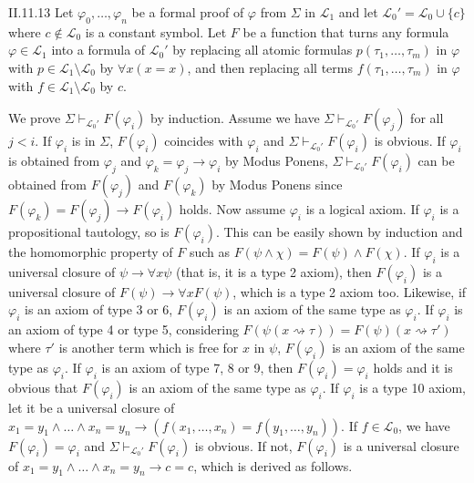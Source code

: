 \documentclass[12pt]{article}
\begin{document}
\begin{customthm}{II.11.13}
  Let $\varphi_0,\ldots,\varphi_n$ be a formal proof of $\varphi$ from $\Sigma$ in $\mathcal{L}_1$ and let $\mathcal{L}_0'=\mathcal{L}_0\cup\{c\}$ where $c\not\in\mathcal{L}_0$ is a constant symbol. Let $F$ be a function that turns any formula $\varphi\in\mathcal{L}_1$ into a formula of $\mathcal{L}_0'$ by replacing all atomic formulas $p(\tau_1,\ldots,\tau_m)$ in $\varphi$ with $p\in\mathcal{L}_1\setminus\mathcal{L}_0$ by $\forall x(x=x)$, and then replacing all terms $f(\tau_1,\ldots,\tau_m)$ in $\varphi$ with $f\in\mathcal{L}_1\setminus\mathcal{L}_0$ by $c$.

  We prove $\Sigma\vdash_{\mathcal{L}_0'}F(\varphi_i)$ by induction. Assume we have $\Sigma\vdash_{\mathcal{L}_0'}F(\varphi_j)$ for all $j<i$. If $\varphi_i$ is in $\Sigma$, $F(\varphi_i)$ coincides with $\varphi_i$ and $\Sigma\vdash_{\mathcal{L}_0'}F(\varphi_i)$ is obvious. If $\varphi_i$ is obtained from $\varphi_j$ and $\varphi_k=\varphi_j\rightarrow\varphi_i$ by Modus Ponens, $\Sigma\vdash_{\mathcal{L}_0'}F(\varphi_i)$ can be obtained from $F(\varphi_j)$ and $F(\varphi_k)$ by Modus Ponens since $F(\varphi_k)=F(\varphi_j)\rightarrow F(\varphi_i)$ holds. Now assume $\varphi_i$ is a logical axiom. If $\varphi_i$ is a propositional tautology, so is $F(\varphi_i)$. This can be easily shown by induction and the homomorphic property of $F$ such as $F(\psi\wedge\chi)=F(\psi)\wedge F(\chi)$. If $\varphi_i$ is a universal closure of $\psi\rightarrow\forall x\psi$ (that is, it is a type 2 axiom), then $F(\varphi_i)$ is a universal closure of $F(\psi)\rightarrow\forall xF(\psi)$, which is a type 2 axiom too. Likewise, if $\varphi_i$ is an axiom of type 3 or 6, $F(\varphi_i)$ is an axiom of the same type as $\varphi_i$. If $\varphi_i$ is an axiom of type 4 or type 5, considering $F(\psi(x\rightsquigarrow\tau))=F(\psi)(x\rightsquigarrow\tau')$ where $\tau'$ is another term which is free for $x$ in $\psi$, $F(\varphi_i)$ is an axiom of the same type as $\varphi_i$. If $\varphi_i$ is an axiom of type 7, 8 or 9, then $F(\varphi_i)=\varphi_i$ holds and it is obvious that $F(\varphi_i)$ is an axiom of the same type as $\varphi_i$. If $\varphi_i$ is a type 10 axiom, let it be a universal closure of $x_1=y_1\wedge\ldots\wedge x_n=y_n\rightarrow(f(x_1,\ldots,x_n)=f(y_1,\ldots,y_n))$. If $f\in\mathcal{L}_0$, we have $F(\varphi_i)=\varphi_i$ and $\Sigma\vdash_{\mathcal{L}_0'}F(\varphi_i)$ is obvious. If not, $F(\varphi_i)$ is a universal closure of $x_1=y_1\wedge\ldots\wedge x_n=y_n\rightarrow c=c$, which is derived as follows.

\end{customthm}
\end{document}
